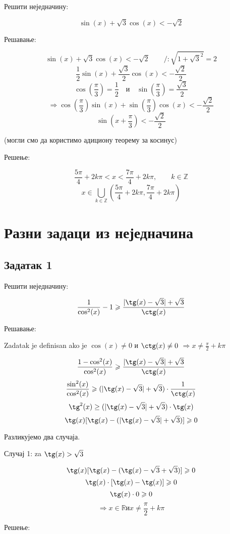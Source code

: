 \documentclass[a4paper,12pt]{article}
\begin{document}
Решити неједначину:

\[\sin(x)+\sqrt{3}\cos(x)<-\sqrt{2}\]

Решавање:

\[\sin(x)+\sqrt{3}\cos(x)<-\sqrt{2}\qquad/:\sqrt{1+\sqrt{3}^{2}}=2\]
\[\frac{1}{2}\sin(x)+\frac{\sqrt{3}}{2}\cos(x)<-\frac{\sqrt{2}}{2}\]
\[\cos\left(\frac{\pi}{3}\right)=\frac{1}{2}\quad\text{и}\quad\sin\left(\frac{\pi}{3}\right)=\frac{\sqrt{3}}{2}\]
\[\Rightarrow\cos\left(\frac{\pi}{3}\right)\sin(x)+\sin\left(\frac{\pi}{3}\right)\cos(x)<-\frac{\sqrt{2}}{2}\]
\[\sin\left(x+\frac{\pi}{3}\right)<-\frac{\sqrt{2}}{2}\]

(могли смо да користимо адициону теорему за косинус)

Решење:

\[\frac{5\pi}{4}+2k\pi<x<\frac{7\pi}{4}+2k\pi,\qquad k\in\mathbb{Z}\]
\[x\in\bigcup_{k\in\mathbb{Z}}\left(\frac{5\pi}{4}+2k\pi,\frac{7\pi}{4}+2k\pi\right)\]


\section{Разни задаци из неједначина}

\subsection{Задатак 1}

Решити неједначину:

\[\frac{1}{\cos^{2}(x)}-1\geqslant\frac{|\tg(x)-\sqrt{3}|+\sqrt{3}}{\ctg(x)}\]

Решавање:

Zadatak je definisan ako je $\cos(x)\neq0$ и $\ctg(x)\neq0$ $\Rightarrow x\neq\frac{\pi}{2}+k\pi$

\[\frac{1-\cos^{2}(x)}{\cos^{2}(x)}\geqslant\frac{|\tg(x)-\sqrt{3}|+\sqrt{3}}{\ctg(x)}\]
\[\frac{\sin^{2}(x)}{\cos^{2}(x)}\geqslant(|\tg(x)-\sqrt{3}|+\sqrt{3})\cdot\frac{1}{\ctg(x)}\]
\[\tg^{2}(x)\geq(|\tg(x)-\sqrt{3}|+\sqrt{3})\cdot\tg(x)\]
\[\tg(x)[\tg(x)-(|\tg(x)-\sqrt{3}|+\sqrt{3})]\geqslant0\]

Разликујемо два случаја.

Случај 1: za $\tg(x)>\sqrt{3}$

\[\tg(x)[\tg(x)-(\tg(x)-\sqrt{3}+\sqrt{3})]\geqslant0\]
\[\tg(x)\cdot[\tg(x)-\tg(x)]\geqslant0\]
\[\tg(x)\cdot0\geqslant0\]
\[\Rightarrow x\in\mathbb{R}\text{и}x\neq\frac{\pi}{2}+k\pi\]

Решење:
\end{document}
